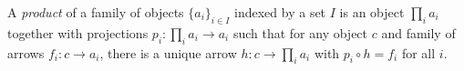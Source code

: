 A \emph{product} of a family of objects $\{a_i\}_{i \in I}$ indexed by a set $I$ is an object $\prod_i a_i$ together with projections $p_i: \prod_i a_i \to a_i$ such that for any object $c$ and family of arrows $f_i: c \to a_i$, there is a unique arrow $h: c \to \prod_i a_i$ with $p_i \circ h = f_i$ for all $i$.

